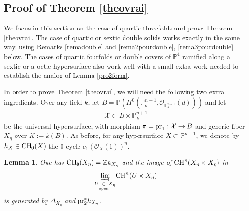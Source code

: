 \documentclass[10pt]{article}
\newtheorem{lemm}[theo]{Lemma}
\begin{document}
\subsection{Proof of Theorem \ref{theovrai}\label{sectheovrai}}

We focus in this section on the case of quartic threefolds and prove Theorem \ref{theovrai}. The case of quartic or sextic double solids  works exactly in the same way, using Remarks \ref{remadouble} and  \ref{rema2pourdouble}, \ref{rema3pourdouble} below. The cases of quartic fourfolds or  double covers of $\mathbb{P}^4$ ramified along a sextic or a octic hypersurface  also work well with a small  extra work needed to establish the analog of Lemma \ref{pro2form}.

In order to prove Theorem \ref{theovrai}, we will need the following two extra ingredients.
  Over any field $k$, let  $B=\mathbb{P}(H^0(\mathbb{P}^{n+1}_k,\mathcal{O}_{\mathbb{P}^{n+1}_k}(d)))$ and let \begin{eqnarray}\label{eqquarticuniv} \mathcal{X}\subset B\times \mathbb{P}^{n+1}_k\end{eqnarray} be the universal hypersurface, with morphism $\pi={\rm pr}_1: \mathcal{X}\rightarrow B$ and generic fiber
$X_{\eta}$ over $K:=k(B)$. As before,  for any hypersurface $X\subset \mathbb{P}^{n+1}$, we denote by $h_X\in{\rm CH}_0(X)$ the $0$-cycle $c_1(\mathcal{O}_X(1))^n$.
\begin{lemm}\label{prodiag} One has ${\rm CH}_0(X_{\eta})=\mathbb{Z} h_{X_{\eta}}$ and the image of ${\rm CH}^n(X_{\eta}\times X_{\eta})$ in $$\underset{{U}\underset{{\rm open}}{\subset} X_{\eta}}{\underrightarrow{\rm lim}}{\rm CH}^n(U\times X_{\eta})$$ is generated by $\Delta_{X_{\eta}}$ and ${\rm pr}_2^* h_{X_\eta}$.
\end{lemm}
\end{document}
